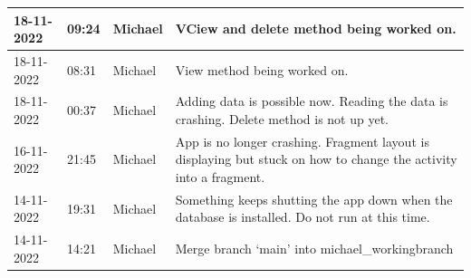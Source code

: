 \documentclass[11pt]{article}
\begin{document}
\begin{center}
\begin{longtable}{|p{2cm}|l|p{2cm}|p{10.5cm}|}
            18-11-2022                                 & 09:24                              & Michael                                 & VCiew and delete method being worked on.                                                                                                                                                                                                                                                                     \\ \hline
            18-11-2022                                 & 08:31                              & Michael                                 & View method being worked on.                                                                                                                                                                                                                                                                                 \\ \hline
            18-11-2022                                 & 00:37                              & Michael                                 & Adding data is possible now. Reading the data is crashing. Delete method is not up yet.                                                                                                                                                                                                                      \\ \hline
            16-11-2022                                 & 21:45                              & Michael                                 & App is no longer crashing. Fragment layout is displaying but stuck on how to change the activity into a fragment.                                                                                                                                                                                            \\ \hline
            14-11-2022                                 & 19:31                              & Michael                                 & Something keeps shutting the app down when the database is installed. Do not run at this time.                                                                                                                                                                                                               \\ \hline
            14-11-2022                                 & 14:21                              & Michael                                 & Merge branch `main' into michael\_workingbranch                                                                                                                                                                                                                                                              \\ \hline

\end{longtable}
\end{center}
\end{document}
